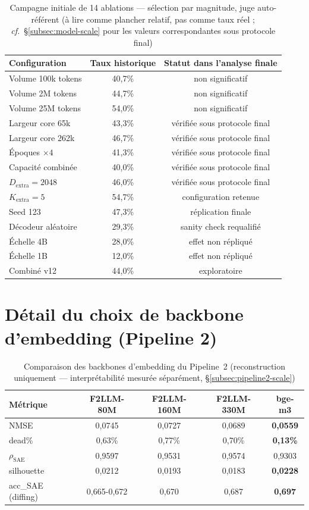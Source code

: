\documentclass[11pt]{article}
\begin{document}
\begin{table}[!ht]
\centering
\caption{Campagne initiale de 14 ablations --- sélection par magnitude, juge
auto-référent (à lire comme plancher relatif, pas comme
taux réel ; \emph{cf.}~\S\ref{subsec:model-scale} pour les valeurs
correspondantes sous protocole final)}
\label{tab:synthese}
\small
\begin{tabular}{@{}lcc@{}}
\toprule
Configuration & Taux historique & Statut dans l'analyse finale \\
\midrule
Volume 100k tokens & 40,7\% & non significatif \\
Volume 2M tokens & 44,7\% & non significatif \\
Volume 25M tokens & 54,0\% & non significatif \\
Largeur core 65k & 43,3\% & vérifiée sous protocole final \\
Largeur core 262k & 46,7\% & vérifiée sous protocole final \\
Époques $\times4$ & 41,3\% & vérifiée sous protocole final \\
Capacité combinée & 40,0\% & vérifiée sous protocole final \\
$D_\text{extra}=2048$ & 46,0\% & vérifiée sous protocole final \\
$K_\text{extra}=5$ & 54,7\% & configuration retenue \\
Seed 123 & 47,3\% & réplication finale \\
Décodeur aléatoire & 29,3\% & sanity check requalifié \\
Échelle 4B & 28,0\% & effet non répliqué \\
Échelle 1B & 12,0\% & effet non répliqué \\
Combiné v12 & 44,0\% & exploratoire \\
\bottomrule
\end{tabular}
\end{table}

\section{Détail du choix de backbone d'embedding (Pipeline 2)}
\label{app:pipeline2}

\begin{table}[!ht]
\centering
\caption{Comparaison des backbones d'embedding du Pipeline~2 (reconstruction
uniquement --- interprétabilité mesurée séparément, \S\ref{subsec:pipeline2-scale})}
\small
\begin{tabular}{@{}lcccc@{}}
\toprule
Métrique & F2LLM-80M & F2LLM-160M & F2LLM-330M & bge-m3 \\ \midrule
NMSE & 0,0745 & 0,0727 & 0,0689 & \textbf{0,0559} \\
dead\% & 0,63\% & 0,77\% & 0,70\% & \textbf{0,13\%} \\
$\rho_\text{SAE}$ & 0,9597 & 0,9531 & 0,9574 & 0,9303 \\
silhouette & 0,0212 & 0,0193 & 0,0183 & \textbf{0,0228} \\
acc\_SAE (diffing) & 0,665-0,672 & 0,670 & 0,687 & \textbf{0,697} \\
\bottomrule
\end{tabular}
\end{table}
\end{document}
